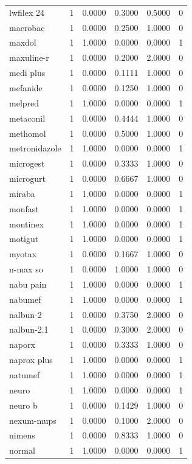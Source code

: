 \begin{longtable}{p{3.0cm}rrrrr}
lwfilex 24 & 1 & 0.0000 & 0.3000 & 0.5000 & 0 \\
macrobac & 1 & 0.0000 & 0.2500 & 1.0000 & 0 \\
maxdol & 1 & 1.0000 & 0.0000 & 0.0000 & 1 \\
maxuline-r & 1 & 0.0000 & 0.2000 & 2.0000 & 0 \\
medi plus & 1 & 0.0000 & 0.1111 & 1.0000 & 0 \\
mefanide & 1 & 0.0000 & 0.1250 & 1.0000 & 0 \\
melpred & 1 & 1.0000 & 0.0000 & 0.0000 & 1 \\
metaconil & 1 & 0.0000 & 0.4444 & 1.0000 & 0 \\
methomol & 1 & 0.0000 & 0.5000 & 1.0000 & 0 \\
metronidazole & 1 & 1.0000 & 0.0000 & 0.0000 & 1 \\
microgest & 1 & 0.0000 & 0.3333 & 1.0000 & 0 \\
microgurt & 1 & 0.0000 & 0.6667 & 1.0000 & 0 \\
miraba & 1 & 1.0000 & 0.0000 & 0.0000 & 1 \\
monfast & 1 & 1.0000 & 0.0000 & 0.0000 & 1 \\
montinex & 1 & 1.0000 & 0.0000 & 0.0000 & 1 \\
motigut & 1 & 1.0000 & 0.0000 & 0.0000 & 1 \\
myotax & 1 & 0.0000 & 0.1667 & 1.0000 & 0 \\
n-max so & 1 & 0.0000 & 1.0000 & 1.0000 & 0 \\
nabu pain & 1 & 1.0000 & 0.0000 & 0.0000 & 1 \\
nabumef & 1 & 1.0000 & 0.0000 & 0.0000 & 1 \\
nalbun-2 & 1 & 0.0000 & 0.3750 & 2.0000 & 0 \\
nalbun-2.1 & 1 & 0.0000 & 0.3000 & 2.0000 & 0 \\
naporx & 1 & 0.0000 & 0.3333 & 1.0000 & 0 \\
naprox plus & 1 & 1.0000 & 0.0000 & 0.0000 & 1 \\
natumef & 1 & 1.0000 & 0.0000 & 0.0000 & 1 \\
neuro & 1 & 1.0000 & 0.0000 & 0.0000 & 1 \\
neuro b & 1 & 0.0000 & 0.1429 & 1.0000 & 0 \\
nexum-mups & 1 & 0.0000 & 0.1000 & 2.0000 & 0 \\
nimens & 1 & 0.0000 & 0.8333 & 1.0000 & 0 \\
normal & 1 & 1.0000 & 0.0000 & 0.0000 & 1 \\

\end{longtable}
